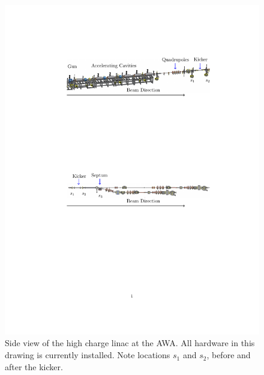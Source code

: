 \begin{figure}
\includegraphics[width=0.9\linewidth]{awa-drawing}
	\caption{Side view of the high charge linac at the AWA. 
		All hardware in this drawing is currently installed. 
	Note locations $s_1$ and $s_2$, before and after the kicker.}
	\label{awa-linac}
\end{figure}

